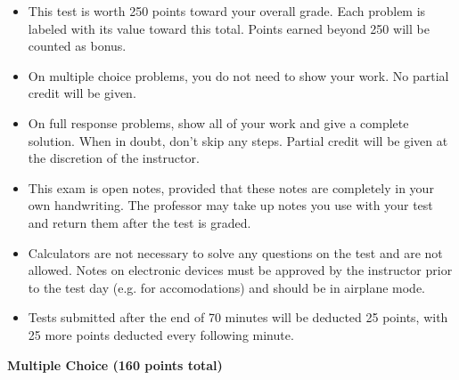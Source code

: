 \documentclass[12pt]{exam}
\newcommand{\<}{\langle}
\renewcommand{\>}{\rangle}
\begin{document}
\begin{center}
\end{center}
\vspace{0.1in}

\vspace{12pt}

\begin{itemize}
  \item This test is worth 250 points toward your overall grade.
        Each problem is labeled with its value toward this total. Points
        earned beyond 250 will be counted as bonus.
  \item On multiple choice problems, you do not need to show your work. No
        partial credit will be given.
  \item On full response problems, show all of your work and give a
        complete solution. When in doubt, don't skip any steps. Partial
        credit will be given at the discretion of the instructor.
  \item This exam is open notes, provided that these notes are completely
        in your own handwriting. The professor may take up notes you use
        with your test and return them after the test is graded.
  \item Calculators are not necessary to solve any questions on the test and
        are not allowed.
        Notes on electronic devices must be approved by the instructor
        prior to the test day (e.g. for accomodations) and should be in
        airplane mode.
  \item Tests submitted after the end of 70 minutes will be deducted 25 points,
        with 25 more points deducted every following minute.
\end{itemize}

\newpage

\begin{center}
  \textbf{Multiple Choice (160 points total)}
\end{center}
\end{document}
